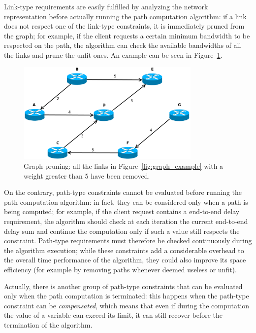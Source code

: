 \documentclass[10pt,a4paper]{report}
\begin{document}
Link-type requirements are easily fulfilled by analyzing the network
representation before actually running the path computation algorithm:
if a link does not respect one of the link-type constraints, it is
immediately pruned from the graph; for example, if the client
requests a certain minimum bandwidth to be respected  on the path, the
algorithm can check the available bandwidths of all the links and
prune the unfit ones. An example can be seen in
Figure~\ref{fig:graph_pruning}.

\begin{figure}[!tbp]
  \begin{center}
    \includegraphics[width=0.8\textwidth]{img/graph_pruning}
    \caption[Graph pruning]{Graph pruning: all the links in
      Figure~\ref{fig:graph_example} with a weight greater than 5 have
      been removed.}
    \label{fig:graph_pruning}
  \end{center}
\end{figure}

On the contrary, path-type constraints cannot be evaluated before
running the path computation algorithm: in fact, they can be
considered only when a path is being computed; for example, if the
client request contains a end-to-end delay requirement, the algorithm
should check at each iteration the current end-to-end delay sum and
continue the computation only if such a value still respects the
constraint. Path-type requirements must therefore be checked
continuously during the algorithm execution; while these constraints
add a considerable overhead to the overall time performance of the
algorithm, they could also improve its space efficiency (for example
by removing paths whenever deemed useless or unfit).

Actually, there is another group of path-type constraints that can be
evaluated only when the path computation is terminated: this happens
when the path-type constraint can be \textit{compensated}, which means
that even if during the computation the value of a variable can exceed
its limit, it can still recover before the termination of the
algorithm.
\end{document}
